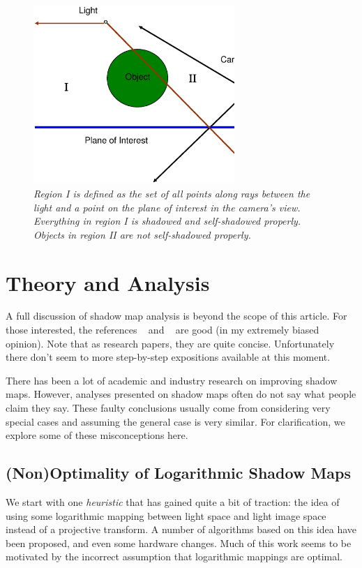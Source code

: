 \documentclass[]{article}  %
\begin{document}
\begin{figure}
	\centering
	  \vspace{-0.8in}
	  \hspace{-0.8in}
		\includegraphics[width=3in]{figure/optfrust.eps}
	\vspace{-1in}
	\caption{\em \small Region I is defined as the set of all points along rays between the light and a point on the plane of interest in the camera's view.  Everything in region I is shadowed and self-shadowed properly.  Objects in region II are not self-shadowed properly.}
	\label{fig:planeopt}
\end{figure}


\section{Theory and Analysis}
A full discussion of shadow map analysis is beyond the scope of this article.  For those interested, the references ~\cite{Chong06} and ~\cite{Chong04} are good (in my extremely biased opinion).  Note that as research papers, they are quite concise.  Unfortunately there don't seem to more step-by-step expositions available at this moment.  

There has been a lot of academic and industry research on improving shadow maps.  However, analyses presented on shadow maps often do not say what people claim they say.  These faulty conclusions usually come from considering very special cases and assuming the general case is very similar.  For clarification, we explore some of these misconceptions here.  

\subsection{(Non)Optimality of Logarithmic Shadow Maps}
We start with one {\em heuristic} that has gained quite a bit of traction: the idea of using some logarithmic mapping between light space and light image space instead of a projective transform.  A number of algorithms based on this idea have been proposed, and even some hardware changes.  Much of this work seems to be motivated by the incorrect assumption that logarithmic mappings are optimal.  
\end{document}
